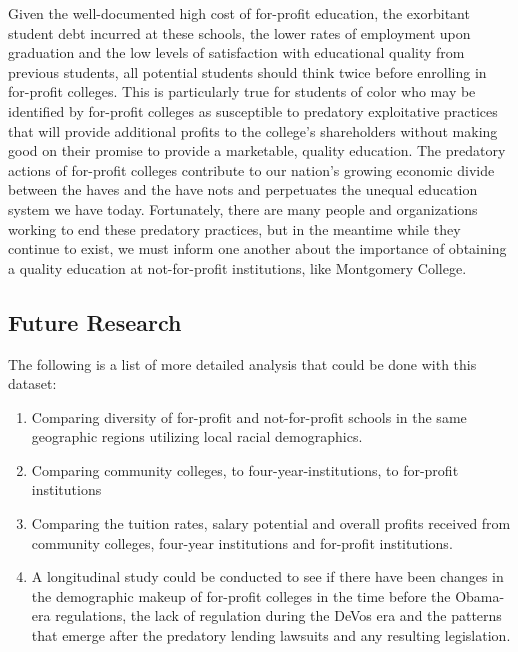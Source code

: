\documentclass[
]{article}
\begin{document}
Given the well-documented high cost of for-profit education, the
exorbitant student debt incurred at these schools, the lower rates of
employment upon graduation and the low levels of satisfaction with
educational quality from previous students, all potential students
should think twice before enrolling in for-profit colleges. This is
particularly true for students of color who may be identified by
for-profit colleges as susceptible to predatory exploitative practices
that will provide additional profits to the college's shareholders
without making good on their promise to provide a marketable, quality
education. The predatory actions of for-profit colleges contribute to
our nation's growing economic divide between the haves and the have nots
and perpetuates the unequal education system we have today. Fortunately,
there are many people and organizations working to end these predatory
practices, but in the meantime while they continue to exist, we must
inform one another about the importance of obtaining a quality education
at not-for-profit institutions, like Montgomery College.

\hypertarget{future-research}{%
\subsection{\texorpdfstring{\textbf{Future
Research}}{Future Research}}\label{future-research}}

The following is a list of more detailed analysis that could be done
with this dataset:

\begin{enumerate}
\def\labelenumi{\arabic{enumi}.}
\item
  Comparing diversity of for-profit and not-for-profit schools in the
  same geographic regions utilizing local racial demographics.
\item
  Comparing community colleges, to four-year-institutions, to for-profit
  institutions
\item
  Comparing the tuition rates, salary potential and overall profits
  received from community colleges, four-year institutions and
  for-profit institutions.
\item
  A longitudinal study could be conducted to see if there have been
  changes in the demographic makeup of for-profit colleges in the time
  before the Obama-era regulations, the lack of regulation during the
  DeVos era and the patterns that emerge after the predatory lending
  lawsuits and any resulting legislation.
\end{enumerate}
\end{document}
